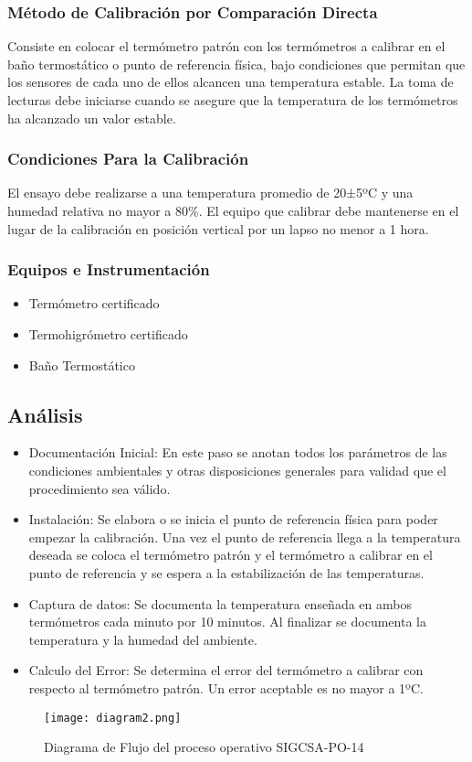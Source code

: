 \subsubsection{Método de Calibración por Comparación Directa}

\par 
	Consiste en colocar el termómetro patrón con los termómetros a calibrar en el baño
	termostático o punto de referencia física, bajo condiciones que permitan que los
	sensores de cada uno de ellos alcancen una temperatura estable. La toma de lecturas
	debe iniciarse cuando se asegure que la temperatura de los termómetros ha alcanzado
	un valor estable\cite{po14}.
\subsubsection{Condiciones Para la Calibración}

\par 
	El ensayo debe realizarse a una temperatura promedio de 20±5ºC y una humedad
	relativa no mayor a 80\%. El equipo que calibrar debe mantenerse en el lugar de la
	calibración en posición vertical por un lapso no menor a 1 hora\cite{po14}.
	
\subsubsection{Equipos e Instrumentación}

\begin{itemize}
	\item Termómetro certificado
	\item Termohigrómetro certificado
	\item Baño Termostático
\end{itemize}

\subsection{Análisis}

\begin{itemize}
\item Documentación Inicial: En este paso se anotan todos los parámetros de las condiciones ambientales y otras disposiciones generales para validad que el procedimiento sea válido.

\item Instalación: Se elabora o se inicia el punto de referencia física para poder empezar la calibración. Una vez el punto de referencia llega a la temperatura deseada se coloca el termómetro patrón y el termómetro a calibrar en el punto de referencia y se espera a la estabilización de las temperaturas.

\item Captura de datos: Se documenta la temperatura enseñada en ambos termómetros cada minuto por 10 minutos. Al finalizar se documenta la temperatura y la humedad del ambiente.

\item Calculo del Error: Se determina el error del termómetro a calibrar con respecto al termómetro patrón. Un error aceptable es no mayor a 1ºC.
\end{itemize}

\begin{figure}[H]
	\centering
	\texttt{[image: diagram2.png]}
	\caption{Diagrama de Flujo del proceso operativo SIGCSA-PO-14}
\end{figure}
